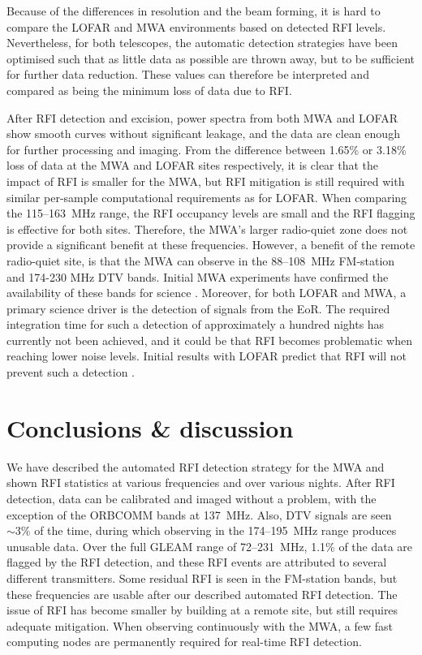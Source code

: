 \documentclass{pasa}
\begin{document}
Because of the differences in resolution and the beam forming, it is hard to compare the LOFAR and MWA environments based on detected RFI levels. Nevertheless, for both telescopes, the automatic detection strategies have been optimised such that as little data as possible are thrown away, but to be sufficient for further data reduction. These values can therefore be interpreted and compared as being the minimum loss of data due to RFI.

After RFI detection and excision, power spectra from both MWA and LOFAR show smooth curves without significant leakage, and the data are clean enough for further processing and imaging. From the difference between 1.65\% or 3.18\% loss of data at the MWA and LOFAR sites respectively, it is clear that the impact of RFI is smaller for the MWA, but RFI mitigation is still required with similar per-sample computational requirements as for LOFAR. When comparing the 115--163~MHz range, the RFI occupancy levels are small and the RFI flagging is effective for both sites. Therefore, the MWA's larger radio-quiet zone does not provide a significant benefit at these frequencies. However, a benefit of the remote radio-quiet site, is that the MWA can observe in the 88--108~MHz FM-station and 174-230 MHz DTV bands. Initial MWA experiments have confirmed the availability of these bands for science \citep{mckinley-moon-2013,mwacs-2014}. Moreover, for both LOFAR and MWA, a primary science driver is the detection of signals from the EoR. The required integration time for such a detection of approximately a hundred nights has currently not been achieved, and it could be that RFI becomes problematic when reaching lower noise levels. Initial results with LOFAR predict that RFI will not prevent such a detection \citep{ncp-eor-yatawatta, offringa-rfi-distributions}.

\section{Conclusions \& discussion} \label{ch:conclusions-and-discussion}
We have described the automated RFI detection strategy for the MWA and shown RFI statistics at various frequencies and over various nights. After RFI detection, data can be calibrated and imaged without a problem, with the exception of the ORBCOMM bands at 137~MHz. Also, DTV signals are seen $\sim3\%$ of the time, during which observing in the 174--195~MHz range produces unusable data. Over the full GLEAM range of 72--231~MHz, 1.1\% of the data are flagged by the RFI detection, and these RFI events are attributed to several different transmitters. Some residual RFI is seen in the FM-station bands, but these frequencies are usable after our described automated RFI detection. The issue of RFI has become smaller by building at a remote site, but still requires adequate mitigation. When observing continuously with the MWA, a few fast computing nodes are permanently required for real-time RFI detection.
\end{document}
